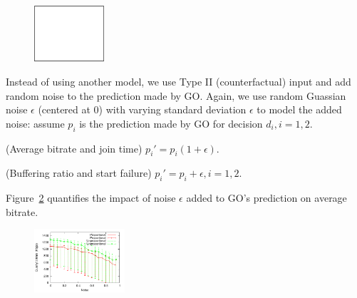 \begin{figure}[h!]
\centering
 \includegraphics[width=0.23\textwidth] {figures/placeholder.pdf}
\label{fig:GO-accuracy-distribution}
\end{figure}

Instead of using another model, we use Type II (counterfactual) input and add random noise to the prediction made by GO. Again, we use random Guassian noise $\epsilon$ (centered at 0) with varying standard deviation $\epsilon$ to model the added noise: assume $p_i$ is the prediction made by GO for decision $d_i,i=1,2$.
\begin{packeditemize}
	\item (Average bitrate and join time) $p_i'=p_i(1+\epsilon)$.
	\item (Buffering ratio and start failure) $p_i'=p_i+\epsilon, i=1,2$.
\end{packeditemize}

Figure~\ref{fig:impact-accuracy-go} quantifies the impact of noise $\epsilon$ added to GO's prediction on average bitrate.

\begin{figure}[h!]
\centering
 \includegraphics[width=0.3\textwidth] {figures/impact/result-noise-impact.pdf}
\label{fig:impact-accuracy-go}
\end{figure}


